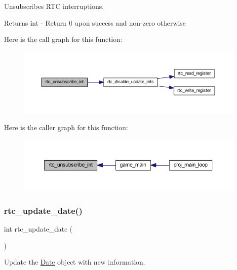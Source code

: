 Unsubscribes R\+TC interruptions. 

\begin{DoxyReturn}{Returns}
int -\/ Return 0 upon success and non-\/zero otherwise 
\end{DoxyReturn}
Here is the call graph for this function\+:
\nopagebreak
\begin{figure}[H]
\begin{center}
\leavevmode
\includegraphics[width=350pt]{group__rtc_gab8f17bf5280c908c8b199a90fefcc758_cgraph}
\end{center}
\end{figure}
Here is the caller graph for this function\+:
\nopagebreak
\begin{figure}[H]
\begin{center}
\leavevmode
\includegraphics[width=350pt]{group__rtc_gab8f17bf5280c908c8b199a90fefcc758_icgraph}
\end{center}
\end{figure}
\mbox{\label{group__rtc_ga1c7900b102529826ac1662355e6cf058}} 
\subsubsection{\texorpdfstring{rtc\+\_\+update\+\_\+date()}{rtc\_update\_date()}}
{\footnotesize\ttfamily int rtc\+\_\+update\+\_\+date (\begin{DoxyParamCaption}{ }\end{DoxyParamCaption})}



Update the \mbox{\hyperlink{struct_date}{Date}} object with new information. 

